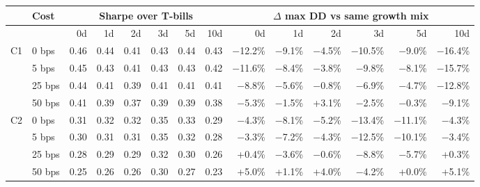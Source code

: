 \begin{tabular}{llrrrrrrrrrrrr}
\toprule
 & Cost & \multicolumn{6}{c}{Sharpe over T-bills} & \multicolumn{6}{c}{$\Delta$ max DD vs same growth mix} \\
\midrule
 &  & 0d & 1d & 2d & 3d & 5d & 10d & 0d & 1d & 2d & 3d & 5d & 10d \\
\midrule
C1 & 0 bps & 0.46 & 0.44 & 0.41 & 0.43 & 0.44 & 0.43 & $-$12.2\% & $-$9.1\% & $-$4.5\% & $-$10.5\% & $-$9.0\% & $-$16.4\% \\
 & 5 bps & 0.45 & 0.43 & 0.41 & 0.43 & 0.43 & 0.42 & $-$11.6\% & $-$8.4\% & $-$3.8\% & $-$9.8\% & $-$8.1\% & $-$15.7\% \\
 & 25 bps & 0.44 & 0.41 & 0.39 & 0.41 & 0.41 & 0.41 & $-$8.8\% & $-$5.6\% & $-$0.8\% & $-$6.9\% & $-$4.7\% & $-$12.8\% \\
 & 50 bps & 0.41 & 0.39 & 0.37 & 0.39 & 0.39 & 0.38 & $-$5.3\% & $-$1.5\% & +3.1\% & $-$2.5\% & $-$0.3\% & $-$9.1\% \\
\midrule
C2 & 0 bps & 0.31 & 0.32 & 0.32 & 0.35 & 0.33 & 0.29 & $-$4.3\% & $-$8.1\% & $-$5.2\% & $-$13.4\% & $-$11.1\% & $-$4.3\% \\
 & 5 bps & 0.30 & 0.31 & 0.31 & 0.35 & 0.32 & 0.28 & $-$3.3\% & $-$7.2\% & $-$4.3\% & $-$12.5\% & $-$10.1\% & $-$3.4\% \\
 & 25 bps & 0.28 & 0.29 & 0.29 & 0.32 & 0.30 & 0.26 & +0.4\% & $-$3.6\% & $-$0.6\% & $-$8.8\% & $-$5.7\% & +0.3\% \\
 & 50 bps & 0.25 & 0.26 & 0.26 & 0.30 & 0.27 & 0.23 & +5.0\% & +1.1\% & +4.0\% & $-$4.2\% & +0.0\% & +5.1\% \\
\bottomrule
\end{tabular}
